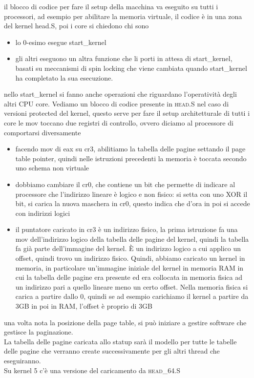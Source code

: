\documentclass[12pt, oneside]{extbook}
\begin{document}
il blocco di codice per fare il setup della macchina va eseguito su tutti i processori, ad esempio per abilitare la memoria virtuale, il codice è in una zona del kernel \textsf{head.S}, poi i core si chiedono chi sono
\begin{itemize}
\item lo 0-esimo esegue start\_kernel
\item gli altri eseguono un altra funzione che li porti in attesa di start\_kernel, basati su meccanismi di spin locking che viene cambiata quando start\_kernel ha completato la sua esecuzione.
\end{itemize}
nello start\_kernel si fanno anche operazioni che riguardano l'operatività degli altri CPU core. Vediamo un blocco di codice presente in \textsc{head.S} nel caso di versioni protected del kernel, questo serve per fare il setup architetturale di tutti i core
le mov toccano due registri di controllo, ovvero diciamo al processore di comportarsi diversamente
\begin{itemize}
\item facendo mov di eax su cr3, abilitiamo la tabella delle pagine settando il page table pointer, quindi nelle istruzioni precedenti la memoria è toccata secondo uno schema non virtuale
\item dobbiamo cambiare il cr0, che contiene un bit che permette di indicare al processore che l'indirizzo lineare è logico e non fisico: si setta con uno XOR il bit, si carica la nuova maschera in cr0, questo indica che d'ora in poi si accede con indirizzi logici
\item il puntatore caricato in cr3 è un indirizzo fisico, la prima istruzione fa una mov dell'indirizzo logico della tabella delle pagine del kernel, quindi la tabella fa già parte dell'immagine del kernel. È un indirizzo logico a cui applico un offset, quindi trovo un indirizzo fisico. Quindi, abbiamo caricato un kernel in memoria, in particolare un'immagine iniziale del kernel in memoria RAM in cui la tabella delle pagine era presente ed era collocata in memoria fisica ad un indirizzo pari a quello lineare meno un certo offset. Nella memoria fisica si carica a partire dallo 0, quindi se ad esempio carichiamo il kernel a partire da 3GB in poi in RAM, l'offset è proprio di 3GB
\end{itemize}
una volta nota la posizione della page table, si può iniziare a gestire software che gestisce la paginazione.\\ La tabella delle pagine caricata allo statup sarà il modello per tutte le tabelle delle pagine che verranno create successivamente per gli altri thread che eseguiranno.\\ Su kernel 5 c'è una versione del caricamento da \textsc{head\_64.S}
\end{document}
